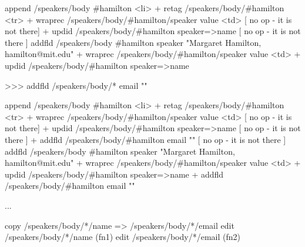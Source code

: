 \documentclass[sigconf,anonymous,screen]{acmart}
\begin{document}
append /speakers/body \#hamilton <li>
+ retag /speakers/body/\#hamilton <tr>
+ wraprec /speakers/body/\#hamilton/speaker value <td> [ no op - it is not there]
+ updid /speakers/body/\#hamilton speaker=>name [ no op - it is not there ]
addfld /speakers/body \#hamilton speaker "Margaret Hamilton, hamilton@mit.edu"
+ wraprec /speakers/body/\#hamilton/speaker value <td>
+ updid /speakers/body/\#hamilton speaker=>name

>>> addfld /speakers/body/* email ""

append /speakers/body \#hamilton <li>
+ retag /speakers/body/\#hamilton <tr>
+ wraprec /speakers/body/\#hamilton/speaker value <td> [ no op - it is not there]
+ updid /speakers/body/\#hamilton speaker=>name [ no op - it is not there ]
+ addfld /speakers/body/\#hamilton email "" [ no op - it is not there ]
addfld /speakers/body \#hamilton speaker "Margaret Hamilton, hamilton@mit.edu"
+ wraprec /speakers/body/\#hamilton/speaker value <td>
+ updid /speakers/body/\#hamilton speaker=>name
+ addfld /speakers/body/\#hamilton email ""

...

copy /speakers/body/*/name => /speakers/body/*/email
edit /speakers/body/*/name (fn1)
edit /speakers/body/*/email (fn2)
\end{document}

